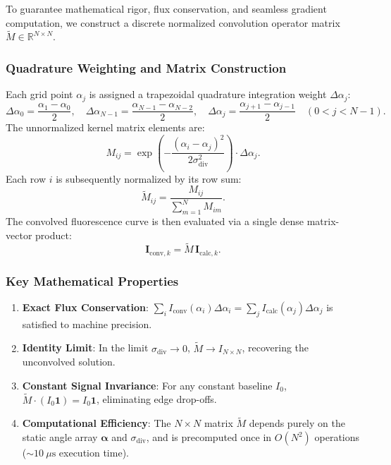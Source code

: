 \documentclass[11pt,a4paper]{article}
\begin{document}
To guarantee mathematical rigor, flux conservation, and seamless gradient computation, we construct a discrete normalized convolution operator matrix $\widetilde{M} \in \mathbb{R}^{N \times N}$.

\subsubsection{Quadrature Weighting and Matrix Construction}
Each grid point $\alpha_j$ is assigned a trapezoidal quadrature integration weight $\Delta\alpha_j$:
\begin{equation}
    \Delta\alpha_0 = \frac{\alpha_1 - \alpha_0}{2}, \quad \Delta\alpha_{N-1} = \frac{\alpha_{N-1} - \alpha_{N-2}}{2}, \quad \Delta\alpha_j = \frac{\alpha_{j+1} - \alpha_{j-1}}{2} \quad (0 < j < N-1).
\end{equation}
The unnormalized kernel matrix elements are:
\begin{equation}
    M_{ij} = \exp\left( -\frac{(\alpha_i - \alpha_j)^2}{2\sigma_{\mathrm{div}}^2} \right) \cdot \Delta\alpha_j.
\end{equation}
Each row $i$ is subsequently normalized by its row sum:
\begin{equation}
    \widetilde{M}_{ij} = \frac{M_{ij}}{\sum_{m=1}^N M_{im}}.
\end{equation}
The convolved fluorescence curve is then evaluated via a single dense matrix-vector product:
\begin{equation}
    \mathbf{I}_{\mathrm{conv}, k} = \widetilde{M} \, \mathbf{I}_{\mathrm{calc}, k}.
\end{equation}

\subsubsection{Key Mathematical Properties}
\begin{enumerate}
    \item \textbf{Exact Flux Conservation}: $\sum_{i} I_{\mathrm{conv}}(\alpha_i) \Delta\alpha_i = \sum_j I_{\mathrm{calc}}(\alpha_j) \Delta\alpha_j$ is satisfied to machine precision.
    \item \textbf{Identity Limit}: In the limit $\sigma_{\mathrm{div}} \to 0$, $\widetilde{M} \to I_{N \times N}$, recovering the unconvolved solution.
    \item \textbf{Constant Signal Invariance}: For any constant baseline $I_0$, $\widetilde{M} \cdot (I_0 \mathbf{1}) = I_0 \mathbf{1}$, eliminating edge drop-offs.
    \item \textbf{Computational Efficiency}: The $N \times N$ matrix $\widetilde{M}$ depends purely on the static angle array $\bm{\alpha}$ and $\sigma_{\mathrm{div}}$, and is precomputed once in $O(N^2)$ operations ($\sim 10\ \mu\text{s}$ execution time).
\end{enumerate}
\end{document}
